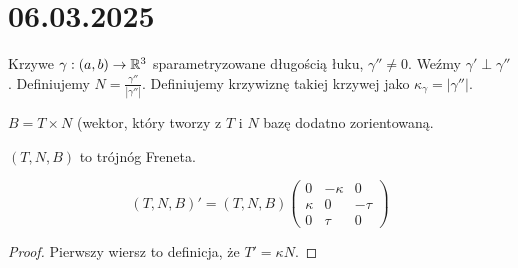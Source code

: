 \section{06.03.2025}{}

\begin{definition}{}{}
  Krzywe $\gamma:(a,b)\to \mathbb{R}^3$ sparametryzowane długością łuku, $\gamma''\neq0$. Weźmy $\gamma'\perp \gamma''$. Definiujemy $N=\frac{\gamma''}{|\gamma''|}$. Definiujemy krzywiznę takiej krzywej jako $\kappa_\gamma=|\gamma''|$.

  $B=T\times N$ (wektor, który tworzy z $T$ i $N$ bazę dodatno zorientowaną.

  $(T,N,B)$ to trójnóg Freneta.
\end{definition}

\begin{theorem}{}{}
  $$(T,N,B)'=(T,N,B)\begin{pmatrix}0 & -\kappa & 0\\ 
  \kappa & 0 & -\tau\\ 
0 & \tau & 0\end{pmatrix}$$
\end{theorem}

\begin{proof}
  Pierwszy wiersz to definicja, że $T'=\kappa N$.
\end{proof}




